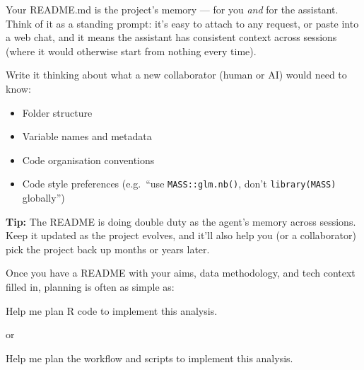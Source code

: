 \documentclass[
  letterpaper,
  DIV=11,
  numbers=noendperiod]{scrreprt}
\providecommand{\tightlist}{%
  \setlength{\itemsep}{0pt}\setlength{\parskip}{0pt}}
\begin{document}
Your README.md is the project's memory --- for you \emph{and} for the
assistant. Think of it as a standing prompt: it's easy to attach to any
request, or paste into a web chat, and it means the assistant has
consistent context across sessions (where it would otherwise start from
nothing every time).

Write it thinking about what a new collaborator (human or AI) would need
to know:

\begin{itemize}
\tightlist
\item
  Folder structure
\item
  Variable names and metadata
\item
  Code organisation conventions
\item
  Code style preferences (e.g.~``use \texttt{MASS::glm.nb()}, don't
  \texttt{library(MASS)} globally'')
\end{itemize}

\textbf{Tip:} The README is doing double duty as the agent's memory
across sessions. Keep it updated as the project evolves, and it'll also
help you (or a collaborator) pick the project back up months or years
later.

Once you have a README with your aims, data methodology, and tech
context filled in, planning is often as simple as:

\begin{tcolorbox}[enhanced jigsaw, bottomtitle=1mm, leftrule=.75mm, breakable, colbacktitle=quarto-callout-note-color!10!white, colframe=quarto-callout-note-color-frame, coltitle=black, toprule=.15mm, rightrule=.15mm, left=2mm, bottomrule=.15mm, title=\textcolor{quarto-callout-note-color}{\faInfo}\hspace{0.5em}{Prompt}, opacityback=0, arc=.35mm, toptitle=1mm, titlerule=0mm, opacitybacktitle=0.6, colback=white]

Help me plan R code to implement this analysis.

\end{tcolorbox}

or

\begin{tcolorbox}[enhanced jigsaw, bottomtitle=1mm, leftrule=.75mm, breakable, colbacktitle=quarto-callout-note-color!10!white, colframe=quarto-callout-note-color-frame, coltitle=black, toprule=.15mm, rightrule=.15mm, left=2mm, bottomrule=.15mm, title=\textcolor{quarto-callout-note-color}{\faInfo}\hspace{0.5em}{Prompt}, opacityback=0, arc=.35mm, toptitle=1mm, titlerule=0mm, opacitybacktitle=0.6, colback=white]

Help me plan the workflow and scripts to implement this analysis.

\end{tcolorbox}
\end{document}

